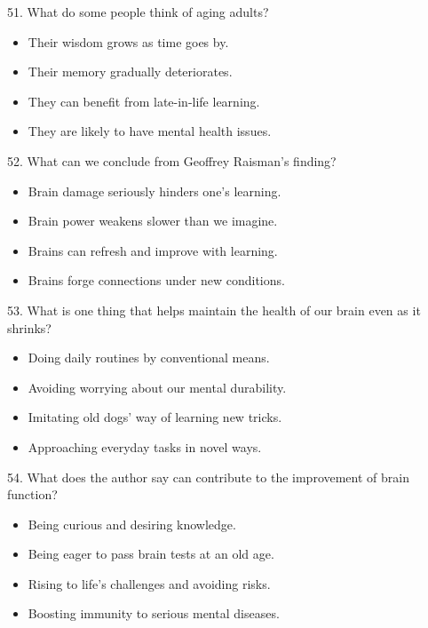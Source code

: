\documentclass[UTF8,11pt]{ctexart}
\begin{document}
51. What do some people think of aging adults?


\begin{itemize}[leftmargin=2em,itemsep=.2em,topsep=.4em]\item[A.] Their wisdom grows as time goes by.
\item[B.] Their memory gradually deteriorates.
\item[C.] They can benefit from late-in-life learning.
\item[D.] They are likely to have mental health issues.
\end{itemize}

52. What can we conclude from Geoffrey Raisman’s finding?


\begin{itemize}[leftmargin=2em,itemsep=.2em,topsep=.4em]\item[A.] Brain damage seriously hinders one’s learning.
\item[B.] Brain power weakens slower than we imagine.
\item[C.] Brains can refresh and improve with learning.
\item[D.] Brains forge connections under new conditions.
\end{itemize}

53. What is one thing that helps maintain the health of our brain even as it shrinks?


\begin{itemize}[leftmargin=2em,itemsep=.2em,topsep=.4em]\item[A.] Doing daily routines by conventional means.
\item[B.] Avoiding worrying about our mental durability.
\item[C.] Imitating old dogs’ way of learning new tricks.
\item[D.] Approaching everyday tasks in novel ways.
\end{itemize}

54. What does the author say can contribute to the improvement of brain function?


\begin{itemize}[leftmargin=2em,itemsep=.2em,topsep=.4em]\item[A.] Being curious and desiring knowledge.
\item[B.] Being eager to pass brain tests at an old age.
\item[C.] Rising to life’s challenges and avoiding risks.
\item[D.] Boosting immunity to serious mental diseases.
\end{itemize}
\end{document}

